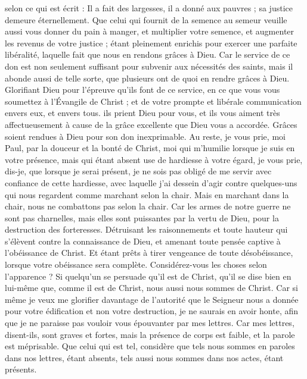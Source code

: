 \begin{multicols}{2}
selon ce qui est écrit : Il a fait des largesses, il a donné aux pauvres ; sa justice demeure éternellement.
Que celui qui fournit de la semence au semeur veuille aussi vous donner du pain à manger, et multiplier votre semence, et augmenter les revenus de votre justice ;
étant pleinement enrichis pour exercer une parfaite libéralité, laquelle fait que nous en rendons grâces à Dieu.
Car le service de ce don est non seulement suffisant pour subvenir aux nécessités des saints, mais il abonde aussi de telle sorte, que plusieurs ont de quoi en rendre grâces à Dieu.
Glorifiant Dieu pour l’épreuve qu’ils font de ce service, en ce que vous vous soumettez à l’Évangile de Christ ; et de votre prompte et libérale communication envers eux, et envers tous.
ils prient Dieu pour vous, et ils vous aiment très affectueusement à cause de la grâce excellente que Dieu vous a accordée.
Grâces soient rendues à Dieu pour son don inexprimable.
\VerseOne{}Au reste, je vous prie, moi Paul, par la douceur et la bonté de Christ, moi qui m'humilie lorsque je suis en votre présence, mais qui étant absent use de hardiesse à votre égard,
je vous prie, dis-je, que lorsque je serai présent, je ne sois pas obligé de me servir avec confiance de cette hardiesse, avec laquelle j'ai dessein d'agir contre quelques-uns qui nous regardent comme marchant selon la chair.
Mais en marchant dans la chair, nous ne combattons pas selon la chair.
Car les armes de notre guerre ne sont pas charnelles, mais elles sont puissantes par la vertu de Dieu, pour la destruction des forteresses.
Détruisant les raisonnements et toute hauteur qui s'élèvent contre la connaissance de Dieu, et amenant toute pensée captive à l'obéissance de Christ.
Et étant prêts à tirer vengeance de toute désobéissance, lorsque votre obéissance sera complète.
Considérez-vous les choses selon l'apparence ? Si quelqu'un se persuade qu’il est de Christ, qu'il se dise bien en lui-même que, comme il est de Christ, nous aussi nous sommes de Christ.
Car si même je veux me glorifier davantage de l’autorité que le Seigneur nous a donnée pour votre édification et non votre destruction, je ne saurais en avoir honte,
afin que je ne paraisse pas vouloir vous épouvanter par mes lettres.
Car mes lettres, disent-ils, sont graves et fortes, mais la présence de corps est faible, et la parole est méprisable.
Que celui qui est tel, considère que tels nous sommes en paroles dans nos lettres, étant absents, tels aussi nous sommes dans nos actes, étant présents.

\end{multicols}
